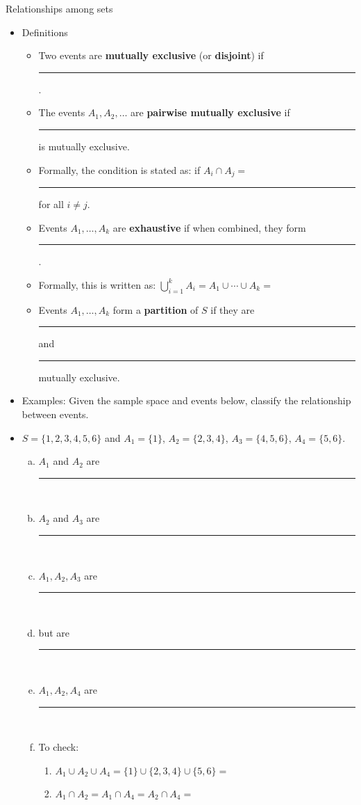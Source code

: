 \documentclass{article}
\newcommand{\blankul}[1]{\rule[-1.5mm]{#1}{0.15mm}}	%
\newcommand{\vecn}[2]{#1_1, \ldots, #1_{#2}}		%
\newcommand{\vecinf}[1]{#1_1, #1_{2}, \ldots}		%
\begin{document}
Relationships among sets\bigskip
\begin{itemize}
    \item Definitions
    \begin{itemize}
        \item Two events are \textbf{mutually exclusive} (or \textbf{disjoint}) if \blankul{5cm}.\vspace{70pt}\\
        \item The events $\vecinf{A}$ are \textbf{pairwise mutually exclusive} if \blankul{3cm} is mutually exclusive.
        \item[] Formally, the condition is stated as: if $A_i \cap A_j = $ \blankul{0.5cm} for all $i \ne j$.\vspace{70pt}\\
        \item Events $\vecn{A}{k}$ are \textbf{exhaustive} if when combined, they form \blankul{5cm}.
        \item[] Formally, this is written as: $\displaystyle \bigcup_{i=1}^{k} A_i = A_1 \cup \cdots \cup A_k = $\vspace{80pt}
        \item Events $\vecn{A}{k}$ form a \textbf{partition} of $S$ if they are \blankul{2cm} and \blankul{2cm} mutually exclusive.\vspace{60pt}\\
    \end{itemize}\bigskip
    \item Examples: Given the sample space and events below, classify the relationship between events.
    \item[] $S = \{1, 2, 3, 4, 5, 6\}$ \quad and \quad $A_1 = \{1\}$, $A_2 = \{2, 3, 4\}$, $A_3 = \{4, 5, 6\}$, $A_4 = \{5, 6\}$.\bigskip
    \begin{enumerate}[(a)]
        \item $A_1$ and $A_2$ are \blankul{3cm}\\
        \item $A_2$ and $A_3$ are \blankul{3cm}\\
        \item $A_1, A_2, A_3$ are \blankul{3cm}\\
        \item[] but are \blankul{4cm}\\
        \item $A_1, A_2, A_4$ are \blankul{3cm}\\
        \item[] To check:
        \begin{enumerate}[1.]
            \item $A_1 \cup A_2 \cup A_4 = \{1\} \cup \{2, 3, 4\} \cup \{5, 6\} = $\\
            \item $A_1 \cap A_2 = A_1 \cap A_4 = A_2 \cap A_4 = $ 
        \end{enumerate}
    \end{enumerate}
\end{itemize}
\end{document}
